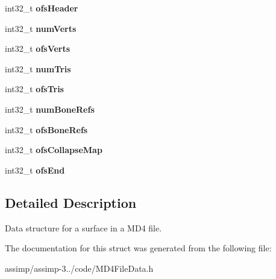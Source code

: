 \begin{DoxyCompactItemize}
\item 
\hypertarget{struct_assimp_1_1_m_d4_1_1_surface_a509d8b682850591351ade0dc2177d9c3}{int32\+\_\+t {\bfseries ofs\+Header}}\label{struct_assimp_1_1_m_d4_1_1_surface_a509d8b682850591351ade0dc2177d9c3}

\item 
\hypertarget{struct_assimp_1_1_m_d4_1_1_surface_a3f4b057b4fe58ed48eba66d2c2d08d52}{int32\+\_\+t {\bfseries num\+Verts}}\label{struct_assimp_1_1_m_d4_1_1_surface_a3f4b057b4fe58ed48eba66d2c2d08d52}

\item 
\hypertarget{struct_assimp_1_1_m_d4_1_1_surface_af84ebaa53a49448c886ea8781afaf8ed}{int32\+\_\+t {\bfseries ofs\+Verts}}\label{struct_assimp_1_1_m_d4_1_1_surface_af84ebaa53a49448c886ea8781afaf8ed}

\item 
\hypertarget{struct_assimp_1_1_m_d4_1_1_surface_ad2b2b850105cd992233772ec07fb0620}{int32\+\_\+t {\bfseries num\+Tris}}\label{struct_assimp_1_1_m_d4_1_1_surface_ad2b2b850105cd992233772ec07fb0620}

\item 
\hypertarget{struct_assimp_1_1_m_d4_1_1_surface_aec17eaa53fb4a01e76742a6943c43454}{int32\+\_\+t {\bfseries ofs\+Tris}}\label{struct_assimp_1_1_m_d4_1_1_surface_aec17eaa53fb4a01e76742a6943c43454}

\item 
\hypertarget{struct_assimp_1_1_m_d4_1_1_surface_a2828d3c8a64b6d58f562f68657a28d58}{int32\+\_\+t {\bfseries num\+Bone\+Refs}}\label{struct_assimp_1_1_m_d4_1_1_surface_a2828d3c8a64b6d58f562f68657a28d58}

\item 
\hypertarget{struct_assimp_1_1_m_d4_1_1_surface_ad17b5890e54dda1a0ef59f5f7914d0d8}{int32\+\_\+t {\bfseries ofs\+Bone\+Refs}}\label{struct_assimp_1_1_m_d4_1_1_surface_ad17b5890e54dda1a0ef59f5f7914d0d8}

\item 
\hypertarget{struct_assimp_1_1_m_d4_1_1_surface_a07d73c3398ac474ef1d8885c3d4841a2}{int32\+\_\+t {\bfseries ofs\+Collapse\+Map}}\label{struct_assimp_1_1_m_d4_1_1_surface_a07d73c3398ac474ef1d8885c3d4841a2}

\item 
\hypertarget{struct_assimp_1_1_m_d4_1_1_surface_ae782a7b7759ceecb27fb90b01365db86}{int32\+\_\+t {\bfseries ofs\+End}}\label{struct_assimp_1_1_m_d4_1_1_surface_ae782a7b7759ceecb27fb90b01365db86}

\end{DoxyCompactItemize}


\subsection{Detailed Description}
Data structure for a surface in a M\+D4 file. 

The documentation for this struct was generated from the following file\+:\begin{DoxyCompactItemize}
\item 
assimp/assimp-\/3../code/M\+D4\+File\+Data.\+h\end{DoxyCompactItemize}
